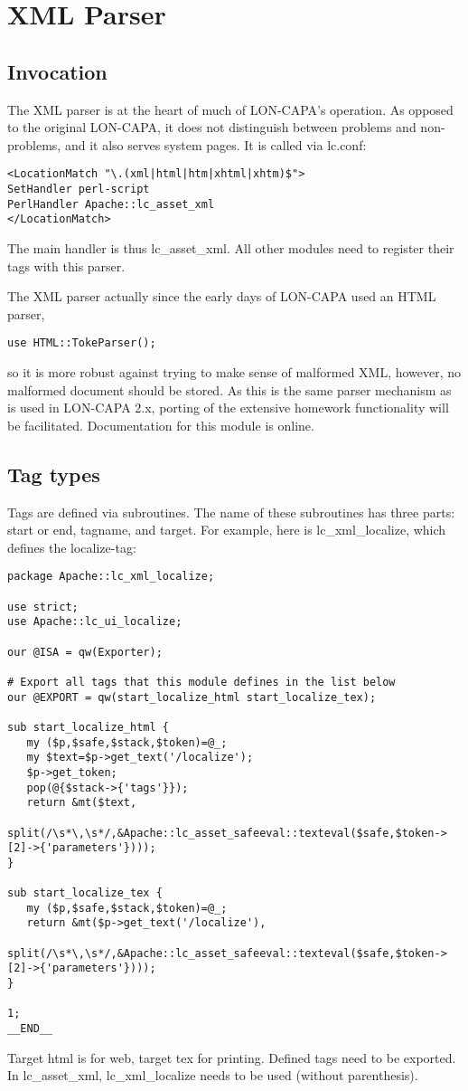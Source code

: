 \chapter{XML Parser}
\section{Invocation}
The XML parser is at the heart of much of LON-CAPA's operation. As opposed to the original LON-CAPA, it does not distinguish between problems and non-problems, and it also serves system pages. It is called via lc.conf:
\begin{verbatim}
<LocationMatch "\.(xml|html|htm|xhtml|xhtm)$">
SetHandler perl-script
PerlHandler Apache::lc_asset_xml
</LocationMatch>
\end{verbatim}
The main handler is thus lc\_asset\_xml. All other modules need to register their tags with this parser.

The XML parser actually since the early days of LON-CAPA used an HTML parser,
\begin{verbatim}
use HTML::TokeParser();
\end{verbatim}
so it is more robust against trying to make sense of malformed XML, however, no malformed document should be stored. As this is the same parser mechanism as
is used in LON-CAPA 2.x, porting of the extensive homework functionality will be facilitated. Documentation for this module is online.
\section{Tag types}
Tags are defined via subroutines. The name of these subroutines has three parts: start or end, tagname, and target. For example, here is lc\_xml\_localize, which defines the localize-tag:
\begin{verbatim}
package Apache::lc_xml_localize;

use strict;
use Apache::lc_ui_localize;

our @ISA = qw(Exporter);

# Export all tags that this module defines in the list below
our @EXPORT = qw(start_localize_html start_localize_tex);

sub start_localize_html {
   my ($p,$safe,$stack,$token)=@_;
   my $text=$p->get_text('/localize');
   $p->get_token;
   pop(@{$stack->{'tags'}});
   return &mt($text,
              split(/\s*\,\s*/,&Apache::lc_asset_safeeval::texteval($safe,$token->[2]->{'parameters'})));
}

sub start_localize_tex {
   my ($p,$safe,$stack,$token)=@_;
   return &mt($p->get_text('/localize'),
              split(/\s*\,\s*/,&Apache::lc_asset_safeeval::texteval($safe,$token->[2]->{'parameters'})));
}

1;
__END__
\end{verbatim}
Target html is for web, target tex for printing. Defined tags need to be exported. In lc\_asset\_xml, lc\_xml\_localize needs to be used (without parenthesis).

